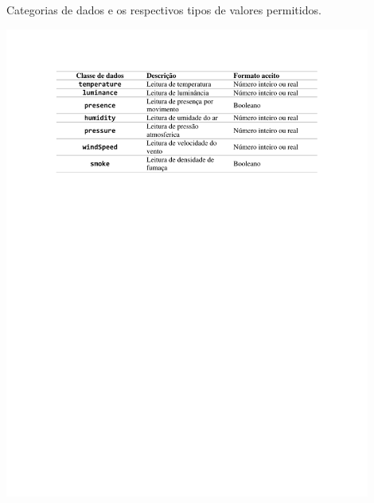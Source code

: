 \begin{table}[hp]
	\caption{Categorias de dados e os respectivos tipos de valores permitidos.}\smallskip
	\label{tab:classesdados}
	\includegraphics[width=0.9\textwidth]{tabelas/classes_dados.pdf}
\end{table}

